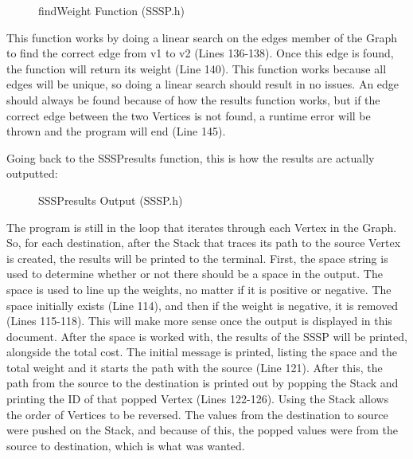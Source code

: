 \documentclass[letterpaper, 10pt]{article}
\begin{document}
\begin{figure}[H]
  \centering
   
  \caption{findWeight Function (SSSP.h)}
  \label{fig:figure2.14}
\end{figure}

\noindent
This function works by doing a linear search on the edges member of the Graph to find the correct edge from v1 to v2 (Lines 136-138). Once this edge is found, the function will return its weight (Line 140). This function works because all edges will be unique, so doing a linear search should result in no issues. An edge should always be found because of how the results function works, but if the correct edge between the two Vertices is not found, a runtime error will be thrown and the program will end (Line 145).

\vspace{1em}
\noindent
Going back to the SSSPresults function, this is how the results are actually outputted:

\begin{figure}[H]
  \centering
   
  \caption{SSSPresults Output (SSSP.h)}
  \label{fig:figure2.15}
\end{figure}

\noindent
The program is still in the loop that iterates through each Vertex in the Graph. So, for each destination, after the Stack that traces its path to the source Vertex is created, the results will be printed to the terminal. First, the space string is used to determine whether or not there should be a space in the output. The space is used to line up the weights, no matter if it is positive or negative. The space initially exists (Line 114), and then if the weight is negative, it is removed (Lines 115-118). This will make more sense once the output is displayed in this document. After the space is worked with, the results of the SSSP will be printed, alongside the total cost. The initial message is printed, listing the space and the total weight and it starts the path with the source (Line 121). After this, the path from the source to the destination is printed out by popping the Stack and printing the ID of that popped Vertex (Lines 122-126). Using the Stack allows the order of Vertices to be reversed. The values from the destination to source were pushed on the Stack, and because of this, the popped values were from the source to destination, which is what was wanted.
\end{document}
